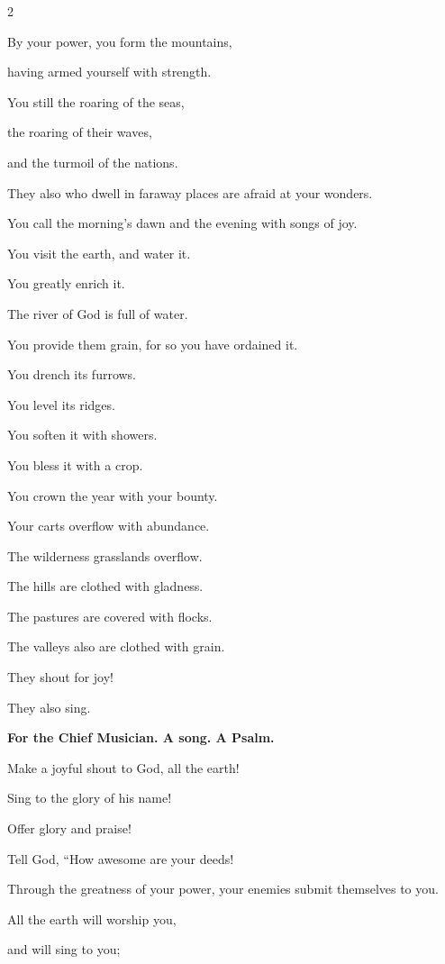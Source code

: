 \begin{multicols}{2}
	
	\myverse{}By your power, you form the mountains,
	
	having armed yourself with strength.
	
	
	\myverse{}You still the roaring of the seas,
	
	the roaring of their waves,
	
	and the turmoil of the nations.
	
	
	\myverse{}They also who dwell in faraway places are afraid at your wonders.
	
	You call the morning’s dawn and the evening with songs of joy.
	
	
	\myverse{}You visit the earth, and water it.
	
	You greatly enrich it.
	
	The river of God is full of water.
	
	You provide them grain, for so you have ordained it.
	
	
	\myverse{}You drench its furrows.
	
	You level its ridges.
	
	You soften it with showers.
	
	You bless it with a crop.
	
	
	\myverse{}You crown the year with your bounty.
	
	Your carts overflow with abundance.
	
	
	\myverse{}The wilderness grasslands overflow.
	
	The hills are clothed with gladness.
	
	
	\myverse{}The pastures are covered with flocks.
	
	The valleys also are clothed with grain.
	
	They shout for joy!
	
	They also sing.
	
	
	\mychapter{}\textbf{For the Chief Musician. A song. A Psalm.}
	
	\quad \myverse*{}Make a joyful shout to God, all the earth!
	
	
	\myverse{}Sing to the glory of his name!
	
	Offer glory and praise!
	
	
	\myverse{}Tell God, “How awesome are your deeds!
	
	Through the greatness of your power, your enemies submit themselves to you.
	
	
	\myverse{}All the earth will worship you,
	
	and will sing to you;
	

\end{multicols}
